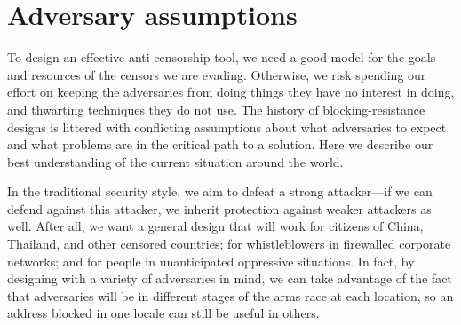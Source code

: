 \documentclass{llncs}
\begin{document}
\section{Adversary assumptions}
\label{sec:adversary}

To design an effective anti-censorship tool, we need a good model for the
goals and resources of the censors we are evading.  Otherwise, we risk
spending our effort on keeping the adversaries from doing things they have no
interest in doing, and thwarting techniques they do not use.
The history of blocking-resistance designs is littered with conflicting
assumptions about what adversaries to expect and what problems are
in the critical path to a solution. Here we describe our best
understanding of the current situation around the world.

In the traditional security style, we aim to defeat a strong
attacker---if we can defend against this attacker, we inherit protection
against weaker attackers as well.  After all, we want a general design
that will work for citizens of China, Thailand, and other censored
countries; for
whistleblowers in firewalled corporate networks; and for people in
unanticipated oppressive situations. In fact, by designing with
a variety of adversaries in mind, we can take advantage of the fact that
adversaries will be in different stages of the arms race at each location,
so an address blocked in one locale can still be useful in others.
\end{document}

